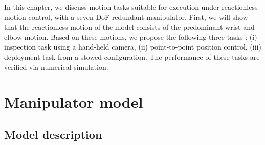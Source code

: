 %
In this chapter,
we discuss motion tasks suitable for execution under reactionless motion control,
with a seven-DoF redundant manipulator.
First, we will show that the reactionless motion of the model consists of the predominant wrist and elbow motion.
Based on these motions,
we propose the following three tasks \cite{Sone2015}:
(i) inspection task using a hand-held camera,
(ii) point-to-point position control,
(iii) deployment task from a stowed configuration.
The performance of these tasks are verified via numerical simulation.

\section{Manipulator model}
\label{sec:MODEL}
\subsection{Model description}

